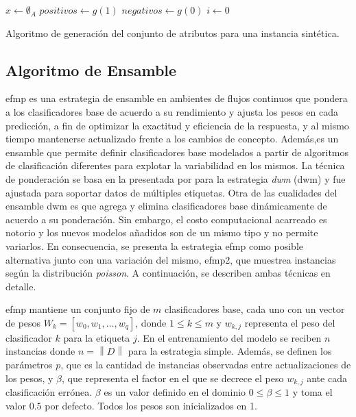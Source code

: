\begin{center}
	\begin{algorithm}[H]
		\label{alg:generar_atributos}
		\SetAlgoLined
		\DontPrintSemicolon
		$x \gets \emptyset_{A}$\;
		$positivos \gets g(1)$ \;
		$negativos \gets g(0)$ \;
		$i \gets 0$ \;
		\caption{Algoritmo de generación del conjunto de atributos para una
			instancia sintética.}
	\end{algorithm}
\end{center}

\subsection{Algoritmo de Ensamble}
\label{tecnica_algoritmo_ensamble}

\acrfull{efmp} es una estrategia de ensamble en ambientes de flujos continuos
que pondera a los clasificadores base de acuerdo a su rendimiento y ajusta los
pesos en cada predicción, a fin de optimizar la exactitud y eficiencia de la
respuesta, y al mismo tiempo mantenerse actualizado frente a los cambios de
concepto. Además,es un ensamble que permite definir clasificadores base
modelados a partir de algoritmos de clasificación diferentes para explotar la
variabilidad en los mismos. La técnica de ponderación se basa en la presentada
por \citeauthor{kolter_dynamic_2007} para la estrategia \textit{\acrlong{dwm}}
(\acrshort{dwm}) \cite{kolter_dynamic_2007} y fue ajustada para soportar datos
de múltiples etiquetas. Otra de las cualidades del ensamble \acrshort{dwm} es
que agrega y elimina clasificadores base dinámicamente de acuerdo a su
ponderación. Sin embargo, el costo computacional acarreado es notorio y los
nuevos modelos añadidos son de un mismo tipo y no permite variarlos.  En
consecuencia, se presenta la estrategia \acrshort{efmp} como posible alternativa
junto con una variación del mismo, \acrshort{efmp2}, que muestrea instancias
según la distribución \textit{poisson}. A continuación, se describen ambas
técnicas en detalle.

\acrshort{efmp} mantiene un conjunto fijo de $m$ clasificadores base, cada uno
con un vector de pesos $W_{k} = [w_{0}, w_{1}, \dots, w_{q}]$, donde $1 \leq k
	\leq m$ y $w_{k,j}$ representa el peso del clasificador $k$ para la etiqueta
$j$. En el entrenamiento del modelo se reciben $n$ instancias donde
$n=\left\|D\right\|$ para la estrategia simple. Además, se definen los parámetros
$p$, que es la cantidad de instancias observadas entre actualizaciones de los
pesos, y $\beta$, que representa el factor en el que se decrece el peso
$w_{k,j}$ ante cada clasificación errónea. $\beta$ es un valor definido en el
dominio $0 \leq \beta \leq 1$ y toma el valor $0.5$ por defecto. Todos los pesos
son inicializados en 1.

